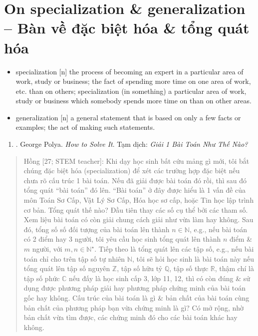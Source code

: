 \documentclass[12pt,oneside]{book}
\begin{document}
\section{On specialization \& generalization -- Bàn về đặc biệt hóa \& tổng quát hóa}

\begin{itemize}\small
	\item {\sf specialization} [n] the process of becoming an expert in a particular area of work, study or business; the fact of spending more time on one area of work, etc. than on others; specialization (in something) a particular area of work, study or business which somebody spends more time on than on other areas.
	\item {\sf generalization} [n] a general statement that is based on only a few facts or examples; the act of making such statements.
\end{itemize}

\begin{enumerate}
	\item \cite{Polya2014}. George Polya. {\it How to Solve It}. {\sf Tạm dịch}: {\it Giải 1 Bài Toán Như Thế Nào?}
\end{enumerate}

\begin{quote}
	{\sf Hồng [27; STEM teacher]}: Khi dạy học sinh bất cứu mảng gì mới, tôi bắt chúng đặc biệt hóa (specialization) để xét các trường hợp đặc biệt nếu chưa rõ cấu trúc 1 bài toán. Nếu đã giải được bài toán đó rồi, thì sau đó tổng quát ``bài toán'' đó lên. ``Bài toán'' ở đây được hiểu là 1 vấn đề của môn Toán Sơ Cấp, Vật Lý Sơ Cấp, Hóa học sơ cấp, hoặc Tin học lập trình cơ bản. Tổng quát thế nào? Đầu tiên thay các số cụ thể bởi các tham số. Xem liệu bài toán có còn giải chung cách giải như vừa làm hay không. Sau đó, tổng số số đối tượng của bài toán lên thành $n\in\mathbb{N}$, e.g., nếu bài toán có 2 điểm hay 3 người, tôi yêu cầu học sinh tổng quát lên thành $n$ điểm \& $m$ người, với $m,n\in\mathbb{N}^\star$. Tiếp theo là tổng quát lên các tập số, e.g., nếu bài toán chỉ cho trên tập số tự nhiên $\mathbb{N}$, tôi sẽ hỏi học sinh là bài toán này nếu tổng quát lên tập số nguyên $\mathbb{Z}$, tập số hữu tỷ $\mathbb{Q}$, tập số thực $\mathbb{R}$, thậm chí là tập số phức $\mathbb{C}$ nếu đấy là học sinh cấp 3, lớp 11, 12, thì có còn đúng \& sử dụng được phương pháp giải hay phương pháp chứng minh của bài toán gốc hay không. Cấu trúc của bài toán là gì \& bản chất của bài toán cùng bản chất của phương pháp bạn vừa chứng minh là gì? Có mở rộng, nhờ bản chất vừa tìm được, các chứng minh đó cho các bài toán khác hay không.
\end{quote}
\end{document}
